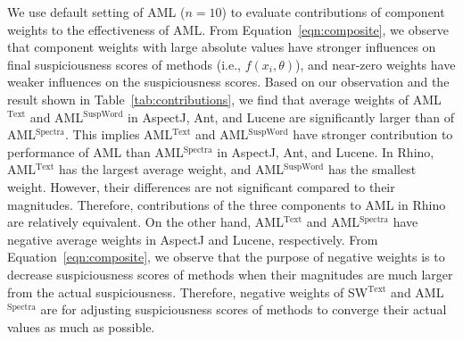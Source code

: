 We use default setting of AML ($n=10$) to evaluate contributions of component weights to the effectiveness of  AML. From Equation~\ref{eqn:composite}, we observe that component weights with large absolute values  have stronger influences on final suspiciousness scores of methods (i.e., $f(x_i, \theta)$), and near-zero weights have weaker influences on the suspiciousness scores. Based on our observation and the  result shown in Table~\ref{tab:contributions}, we find that average weights of AML$^\text{Text}$ and AML$^\text{SuspWord}$ in AspectJ, Ant, and Lucene are significantly larger than of AML$^\text{Spectra}$. This implies AML$^\text{Text}$ and AML$^\text{SuspWord}$ have stronger contribution to performance of AML than  AML$^\text{Spectra}$ in AspectJ, Ant, and Lucene. In Rhino, 
AML$^\text{Text}$ has the largest average weight, and AML$^\text{SuspWord}$ has the smallest weight. However, their differences are not significant compared to their magnitudes. Therefore, contributions of the three components to AML in Rhino are  relatively equivalent. On the other hand, AML$^\text{Text}$ and AML$^\text{Spectra}$ have negative average weights in AspectJ and Lucene, respectively. From Equation~\ref{eqn:composite}, we  observe that the purpose of negative weights is to decrease suspiciousness scores of methods when their magnitudes are much larger from the actual suspiciousness. Therefore, negative weights of SW$^\text{Text}$ and AML$^\text{Spectra}$ are for adjusting suspiciousness scores of methods to converge their actual values as much as possible.